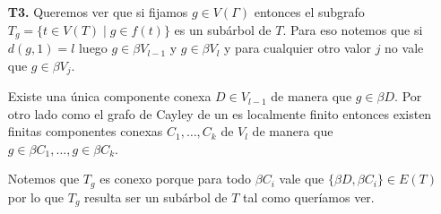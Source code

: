 \documentclass[tesis.tex]{subfiles}
\begin{document}
\begin{obs}
\begin{enumerate}
		\item[\textbf{T3.}] Queremos ver que si fijamos $g \in V(\Gamma)$ entonces el subgrafo $T_{g} = \{ t \in V(T) \mid g \in f(t) \} $ es un subárbol de $T$.
		Para eso notemos que si $d(g,1) = l$ luego $g \in \beta V_{l-1}$ y $g \in \beta V_{l}$ y para cualquier otro valor $j$ no vale que $g \in \beta V_{j}$.
		
		Existe una única componente conexa $D \in V_{l-1}$ de manera que $g \in \beta D$. 
		Por otro lado como el grafo de Cayley de un \fg es localmente finito entonces existen finitas componentes conexas $C_{1}, \dots, C_{k}$ de $V_{l}$ de manera que $g \in \beta C_{1}, \dots, g \in \beta C_{k}$.

		Notemos que $T_{g}$ es conexo porque para todo $\beta C_{i}$ vale que $\{ \beta D, \beta C_{i} \} \in E(T)$ por lo que $T_{g}$ resulta ser un subárbol de $T$ tal como queríamos ver.
		 
	\end{enumerate}
\end{obs}
\end{document}
